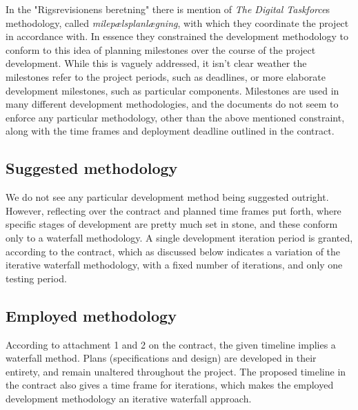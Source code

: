 \documentclass[11pt]{article}
\begin{document}
In the "Rigsrevisionens beretning" there is mention of {\it The Digital Taskforce}s methodology, called {\it milepælsplanlægning}, with which they coordinate the project in accordance with. In essence they constrained the development methodology to conform to this idea of planning milestones over the course of the project development. While this is vaguely addressed, it isn't clear weather the milestones refer to the project periods, such as deadlines, or more elaborate development milestones, such as particular components. Milestones are used in many different development methodologies, and the documents do not seem to enforce any particular methodology, other than the above mentioned constraint, along with the time frames and deployment deadline outlined in the contract.

\subsection{Suggested methodology}
\label{sec:B|sub:suggested-method}

We do not see any particular development method being suggested outright. However, reflecting over the contract and planned time frames put forth, where specific stages of development are pretty much set in stone, and these conform only to a waterfall methodology. A single development iteration period is granted, according to the contract, which as discussed below indicates a variation of the iterative waterfall methodology, with a fixed number of iterations, and only one testing period.

\subsection{Employed methodology}
\label{sec:B|sub:employed-method}
According to attachment 1 and 2 on the contract, the given timeline implies a waterfall method. Plans (specifications and design) are developed in their entirety, and remain unaltered throughout the project. The proposed timeline in the contract also gives a time frame for iterations, which makes the employed development methodology an iterative waterfall approach.
\end{document}
